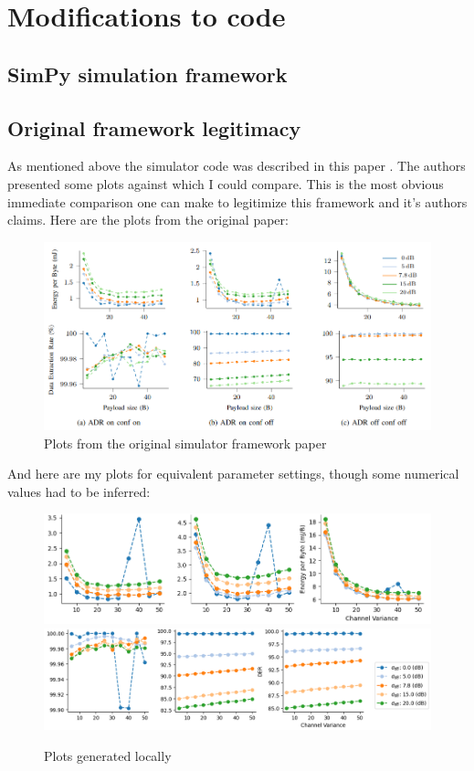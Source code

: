 \chapter{Modifications to code}

\section{SimPy simulation framework}

\section{Original framework legitimacy}
As mentioned above the simulator code was described in this 
paper \cite{simulator}. The authors presented some plots against
which I could compare. This is the most obvious immediate 
comparison one can make to legitimize this framework and it's
authors claims. Here are the plots from the original paper:

\begin{figure}[h]
\centering
\includegraphics[scale=0.6]{figures/original_plots.PNG}
  \caption{Plots from the original simulator framework paper \cite{simulator}}
  \label{fig:my_sectors}
\end{figure}

And here are my plots for equivalent parameter settings, though
some numerical values had to be inferred:

\begin{figure}[H]
\centering
\includegraphics[scale=0.5]{figures/my_plots_1.PNG}\\
\hspace*{1.3cm}  
\includegraphics[scale=0.5]{figures/my_plots_2.PNG}
  \caption{Plots generated locally}
  \label{fig:my_sectors}
\end{figure}

